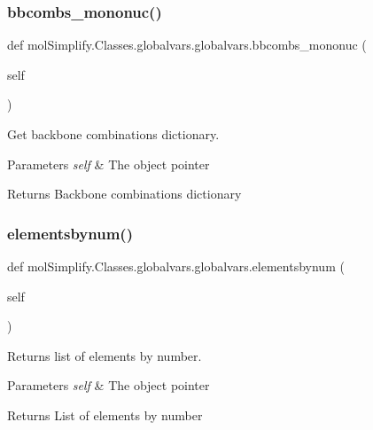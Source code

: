 \subsubsection{\texorpdfstring{bbcombs\+\_\+mononuc()}{bbcombs\_mononuc()}}
{\footnotesize\ttfamily def mol\+Simplify.\+Classes.\+globalvars.\+globalvars.\+bbcombs\+\_\+mononuc (\begin{DoxyParamCaption}\item[{}]{self }\end{DoxyParamCaption})}



Get backbone combinations dictionary. 


\begin{DoxyParams}{Parameters}
{\em self} & The object pointer \\
\hline
\end{DoxyParams}
\begin{DoxyReturn}{Returns}
Backbone combinations dictionary 
\end{DoxyReturn}
\mbox{\label{classmolSimplify_1_1Classes_1_1globalvars_1_1globalvars_a056773e84caa30b9ef6bb482f7ebd68d}} 
\subsubsection{\texorpdfstring{elementsbynum()}{elementsbynum()}}
{\footnotesize\ttfamily def mol\+Simplify.\+Classes.\+globalvars.\+globalvars.\+elementsbynum (\begin{DoxyParamCaption}\item[{}]{self }\end{DoxyParamCaption})}



Returns list of elements by number. 


\begin{DoxyParams}{Parameters}
{\em self} & The object pointer \\
\hline
\end{DoxyParams}
\begin{DoxyReturn}{Returns}
List of elements by number 
\end{DoxyReturn}
\mbox{\label{classmolSimplify_1_1Classes_1_1globalvars_1_1globalvars_a624f761230e8d21715ab233d96991398}} 
